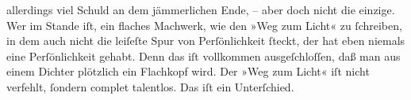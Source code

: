                allerdings viel Schuld an dem jämmerlichen Ende, – aber doch nicht die einzige. Wer
               im Stande iſt, ein flaches Machwerk, wie den »Weg zum
                  Licht« zu ſchreiben, in dem auch nicht die leiſeſte Spur von Perſönlichkeit
               ſteckt, der hat eben niemals eine Perſönlichkeit gehabt. Denn das iſt vollkommen
               ausgeſchloſſen, daß man aus einem Dichter {\pb}plötzlich
               ein Flachkopf wird. Der »Weg zum Licht« iſt
               nicht verfehlt, ſondern complet talentlos. Das iſt ein Unterſchied.\pend
           
